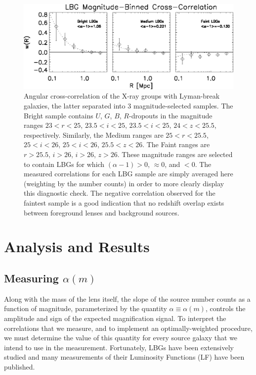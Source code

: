 \begin{figure}
\begin{center}
\includegraphics[scale=1.2]{plots_ch2/magbinnedLBGs_multiNFWfit.eps}
\caption[Magnitude-Binned Cross-Correlation]{Angular cross-correlation of the X-ray groups with Lyman-break galaxies, the latter separated into 3 magnitude-selected samples.  The Bright sample contains $U$, $G$, $B$, $R$-dropouts in the magnitude ranges $23<r<25$, $23.5<i<25$,  $23.5<i<25$,  $24<z<25.5$, respectively. Similarly, the Medium ranges are $25<r<25.5$, $25<i<26$,  $25<i<26$,  $25.5<z<26$.  The Faint ranges are $r>25.5$, $i>26$,  $i>26$,  $z>26$. These magnitude ranges are selected to contain LBGs for which $(\alpha-1)>0$, $\approx 0$, and $<0$.  The measured correlations for each LBG sample are simply averaged here (weighting by the number counts) in order to more clearly display this diagnostic check.  The negative correlation observed for the faintest sample is a good indication that no redshift overlap exists between foreground lenses and background sources.}
\label{MagBinned}
\end{center}
\end{figure}

\section{Analysis and Results}
\label{results}
\subsection{Measuring $\alpha(m)$}
Along with the mass of the lens itself, the slope of the source number counts as a function of magnitude, parameterized by the quantity $\alpha \equiv \alpha(m)$, controls the amplitude and sign of the expected magnification signal.  To interpret the correlations that we measure, and to implement an optimally-weighted procedure, we must determine the value of this quantity for every source galaxy that we intend to use in the measurement.  Fortunately, LBGs have been extensively studied and many measurements of their Luminosity Functions (LF) have been published.  

